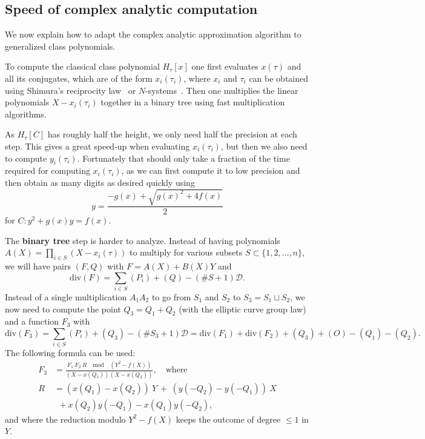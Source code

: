 \documentclass{amsart}
\renewcommand{\div}{\mathrm{div}}
\newcommand{\HC}{H_\tau[\curve]}
\newcommand{\Hx}{H_\tau[x]}
\newcommand{\D}{\mathcal{D}}
\newcommand{\curve}{C}
\numberwithin{equation}{section}
\theoremstyle{definition}
\begin{document}
    \subsection{Speed of complex analytic computation}
    \label{ssec:complexanalytic}
    
    We now explain how to adapt the complex analytic approximation
    algorithm to generalized class polynomials.
    
    To compute the classical class polynomial $\Hx$ one first evaluates $x(\tau)$
    and all its conjugates, which are of the form $x_i(\tau_i)$,
    where $x_i$ and $\tau_i$ can be obtained
    using Shimura's reciprocity law~\cite{gee-stevenhagen1998}
    or $N$-systems~\cite{schertz2002weber}.
    Then one multiplies the linear polynomials $X-x_i(\tau_i)$ together
    in a binary tree using fast multiplication algorithms.
    
    As $\HC$ has roughly half the height, we only need half the precision
    at each step. This gives a great speed-up when evaluating $x_i(\tau_i)$,
    but then we also need to compute $y_i(\tau_i)$.
    Fortunately that should only take a fraction of the time required
    for computing $x_i(\tau_i)$, as we can first compute it to low precision
    and then obtain as many digits as desired quickly using
    $$ y =  \frac{-g(x) + \sqrt{g(x)^2+4f(x)}}{2}$$
    for $C : y^2 + g(x) y = f(x)$.
    
    The \textbf{binary tree} step is harder to analyze.
    Instead of having polynomials
    $A(X) = \prod_{i\in S} (X-x_i(\tau))$ to multiply for various subsets $S\subset\{1,2,\ldots, n\}$,
    we will have pairs $(F, Q)$ with
    $F = A(X)+B(X)Y$ and
    $$\div(F) = \sum_{i\in S} (P_i) + (Q) - (\#S+1)\D.$$ 
    Instead of a single multiplication $A_1A_2$
    to go from $S_1$ and $S_2$ to $S_3 = S_1\sqcup S_2$,
    we now need to compute the point $Q_3 = Q_1+Q_2$
    (with the elliptic curve group law)
    and a function $F_3$ with
    $$ \div(F_3) = \sum_{i\in S} (P_i) + (Q_3) - (\#S_3+1)\D
    = \div(F_1)+\div(F_2) + (Q_3) + (O) - (Q_1) - (Q_2).$$
    The following formula can be used:
    \begin{align}
    	F_3 &= \frac{F_1\ F_2\  R
    		\quad \mathrm{mod}\quad (Y^2-f(X))}
    	{(X-x(Q_1))(X-x(Q_2))},\quad \mbox{where}\label{eq:F3}
    	\\
    	R &=
    	(x(Q_1)-x(Q_2))\ Y\  +\  (y(-Q_2)-y(-Q_1))\ X\\
    	&\ \  + x(Q_2)y(-Q_1) - x(Q_1)y(-Q_2),
    \end{align}
    and  
    where the reduction modulo
    $Y^2-f(X)$ keeps the outcome of degree $\leq 1$ in $Y$.
    
\end{document}
